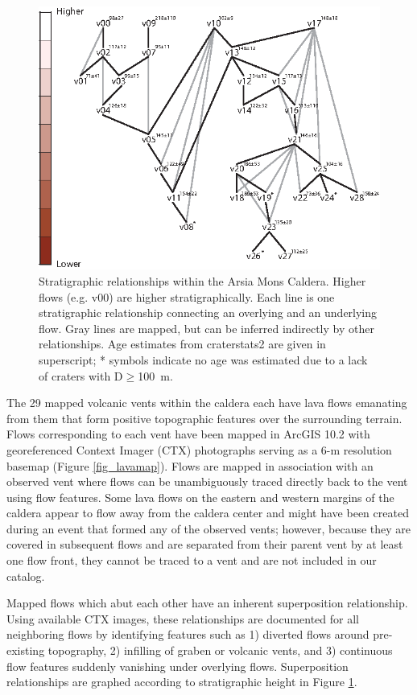 \documentclass[12pt,letter]{article}
\begin{document}
\begin{figure}
\centering
\includegraphics[width=0.6\linewidth]{figures/stratigraphy_web.png}
\caption{Stratigraphic relationships within the Arsia Mons Caldera. Higher flows (e.g. v00) are higher stratigraphically. Each line is one stratigraphic relationship connecting an overlying and an underlying flow. Gray lines are mapped, but can be inferred indirectly by other relationships. Age estimates from craterstats2 are given in superscript; * symbols indicate no age was estimated due to a lack of craters with D$\ge$100~m.}
\label{fig_stratweb}
\end{figure}

The 29 mapped volcanic vents within the caldera each have lava flows emanating from them that form positive topographic features over the surrounding terrain. Flows corresponding to each vent have been mapped in ArcGIS 10.2 with georeferenced Context Imager (CTX) photographs \citep{malin2007context} serving as a 6-m resolution basemap (Figure \ref{fig_lavamap}). Flows are mapped in association with an observed vent where flows can be unambiguously traced directly back to the vent using flow features. Some lava flows on the eastern and western margins of the caldera appear to flow away from the caldera center and might have been created during an event that formed any of the observed vents; however, because they are covered in subsequent flows and are separated from their parent vent by at least one flow front, they cannot be traced to a vent and are not included in our catalog.

Mapped flows which abut each other have an inherent superposition relationship. Using available CTX images, these relationships are documented for all neighboring flows by identifying features such as 1) diverted flows around pre-existing topography, 2) infilling of graben or volcanic vents, and 3) continuous flow features suddenly vanishing under overlying flows. Superposition relationships are graphed according to stratigraphic height in Figure \ref{fig_stratweb}.
\end{document}
